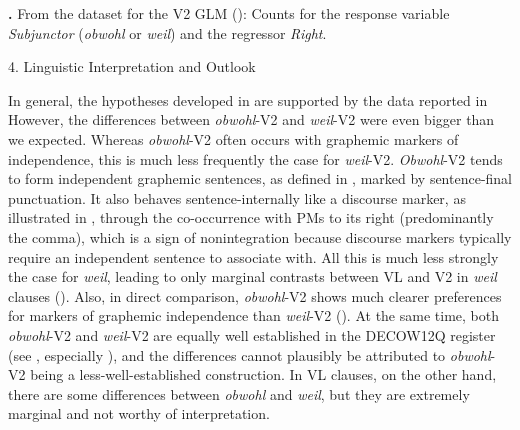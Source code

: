 \begin{styleMoutonCaption}
\textbf{.} From the dataset for the V2 GLM (): Counts for the response vari\-able \textit{Sub\-junctor} (\textit{obwohl} or \textit{weil}) and the regressor \textit{Right}.
\end{styleMoutonCaption}

\begin{styleMoutonHeadingi}
4.  Linguistic Interpretation and Outlook
\end{styleMoutonHeadingi}

\begin{styleMoutonText}
In general, the hypotheses developed in  are supported by the data reported in  However, the differences between \textit{obwohl}{}-V2 and \textit{weil}{}-V2 were even bigger than we expected. Whereas \textit{obwohl}{}-V2 often occurs with graphemic markers of independence, this is much less frequently the case for \textit{weil}{}-V2. \textit{Obwohl}{}-V2 tends to form independent graphemic sentences, as defined in , marked by sentence-final punctuation. It also behaves sentence-internally like a discourse marker, as illustrated in , through the co-occurrence with PMs to its right (predominantly the comma), which is a sign of nonintegration because discourse markers typically require an independent sentence to associate with. All this is much less strongly the case for \textit{weil}, leading to only marginal contrasts between VL and V2 in \textit{weil} clauses (). Also, in direct comparison, \textit{obwohl}{}-V2 shows much clearer preferences for markers of graphemic independence than \textit{weil}{}-V2 (). At the same time, both \textit{obwohl}{}-V2 and \textit{weil}{}-V2 are equally well established in the DECOW12Q register (see , especially ), and the differences cannot plausibly be attributed to \textit{obwohl}{}-V2 being a less-well-established construction. In VL clauses, on the other hand, there are some differences between \textit{obwohl} and \textit{weil}, but they are extremely marginal and not worthy of interpretation.
\end{styleMoutonText}


